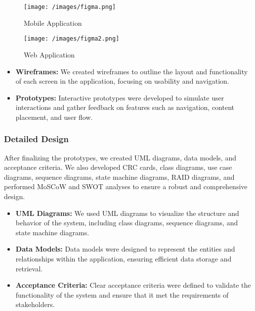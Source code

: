 \begin{figure}[H]
    \centering
    \texttt{[image: /images/figma.png]}
    \caption{Mobile Application}
    \label{fig:example_image}
  \end{figure}

  \begin{figure}[H]
    \centering
    \texttt{[image: /images/figma2.png]}
    \caption{Web Application}
    \label{fig:example_image}
  \end{figure}


\begin{itemize}
  \item \textbf{Wireframes:} We created wireframes to outline the layout and functionality of each screen in the application, focusing on usability and navigation.
  
  \item \textbf{Prototypes:} Interactive prototypes were developed to simulate user interactions and gather feedback on features such as navigation, content placement, and user flow.
\end{itemize}

\subsubsection{Detailed Design}
After finalizing the prototypes, we created UML diagrams, data models, and acceptance criteria. We also developed CRC cards, class diagrams, use case diagrams, sequence diagrams, state machine diagrams, RAID diagrams, and performed MoSCoW and SWOT analyses to ensure a robust and comprehensive design.

\begin{itemize}
  \item \textbf{UML Diagrams:} We used UML diagrams to visualize the structure and behavior of the system, including class diagrams, sequence diagrams, and state machine diagrams.
  
  \item \textbf{Data Models:} Data models were designed to represent the entities and relationships within the application, ensuring efficient data storage and retrieval.
  
  \item \textbf{Acceptance Criteria:} Clear acceptance criteria were defined to validate the functionality of the system and ensure that it met the requirements of stakeholders.
\end{itemize}

